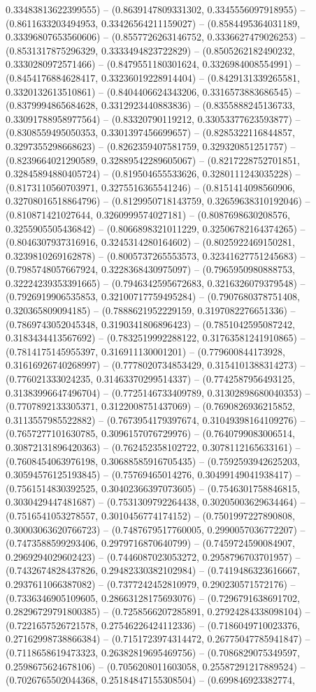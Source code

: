 0.33483813622399555) -- (0.8639147809331302, 0.3345556097918955) -- (0.8611633203494953, 0.33426564211159027) -- (0.8584495364031189, 0.33396807653560606) -- (0.8557726263146752, 0.3336627479026253) -- (0.8531317875296329, 0.3333494823722829) -- (0.8505262182490232, 0.3330280972571466) -- (0.8479551180301624, 0.3326984008554991) -- (0.8454176884628417, 0.33236019228914404) -- (0.8429131339265581, 0.3320132613510861) -- (0.8404406624343206, 0.3316573883686545) -- (0.8379994865684628, 0.3312923440883836) -- (0.8355888245136733, 0.33091788958977564) -- (0.83320790119212, 0.33053377623593877) -- (0.8308559495050353, 0.3301397456699657) -- (0.8285322116844857, 0.3297355298668623) -- (0.8262359407581759, 0.329320851251757) -- (0.8239664021290589, 0.32889542289605067) -- (0.8217228752701851, 0.32845894880405724) -- (0.819504655533626, 0.3280111243035228) -- (0.8173110560703971, 0.3275516365541246) -- (0.8151414098560906, 0.32708016518864796) -- (0.8129950718143759, 0.32659638310192046) -- (0.810871421027644, 0.3260999574027181) -- (0.8087698630208576, 0.3255905505436842) -- (0.8066898321011229, 0.32506782164374265) -- (0.8046307937316916, 0.3245314280164602) -- (0.8025922469150281, 0.3239810269162878) -- (0.8005737265553573, 0.32341627751245683) -- (0.7985748057667924, 0.3228368430975097) -- (0.7965950980888753, 0.32224239353391665) -- (0.7946342595672683, 0.3216326079379548) -- (0.7926919906535853, 0.32100717759495284) -- (0.7907680378751408, 0.320365809094185) -- (0.7888621952229159, 0.3197082276651336) -- (0.7869743052045348, 0.3190341806896423) -- (0.7851042595087242, 0.3183434413567692) -- (0.7832519992288122, 0.31763581241910865) -- (0.7814175145955397, 0.316911130001201) -- (0.779600844173928, 0.31616926740268997) -- (0.7778020734853429, 0.3154101388314273) -- (0.776021333024235, 0.31463370299514337) -- (0.7742587956493125, 0.31383996647496704) -- (0.7725146733409789, 0.31302898680040353) -- (0.7707892133305371, 0.3122008751437069) -- (0.7690826936215852, 0.3113557985522882) -- (0.7673954179397674, 0.31049398164109276) -- (0.7657277101630785, 0.3096157076729976) -- (0.7640799083006514, 0.30872131896420363) -- (0.762452358102722, 0.3078112165633161) -- (0.7608454063976198, 0.30688585916705435) -- (0.7592593942625203, 0.30594576125193845) -- (0.75769465014276, 0.30499149041938417) -- (0.7561514830392525, 0.30402366397073605) -- (0.7546301758846815, 0.3030429447481687) -- (0.7531309792264438, 0.30205003629634464) -- (0.7516541053278557, 0.3010456774174152) -- (0.7501997227890808, 0.30003063620766723) -- (0.7487679517760005, 0.2990057036772207) -- (0.7473588599293406, 0.2979716870640799) -- (0.7459724590084907, 0.2969294029602423) -- (0.7446087023053272, 0.2958796703701957) -- (0.7432674828437826, 0.29482330382102984) -- (0.7419486323616667, 0.2937611066387082) -- (0.7377242452810979, 0.290230571572176) -- (0.7336346905109605, 0.28663128175693076) -- (0.7296791638691702, 0.28296729791800385) -- (0.7258566207285891, 0.27924284338098104) -- (0.7221657526721578, 0.27546226424112336) -- (0.7186049710023376, 0.27162998738866384) -- (0.7151723974314472, 0.26775047785941847) -- (0.7118658619473323, 0.26382819695469756) -- (0.7086829075349597, 0.2598675624678106) -- (0.7056208011603058, 0.25587291217889524) -- (0.7026765502044368, 0.25184847155308504) -- (0.699846923382774, 
